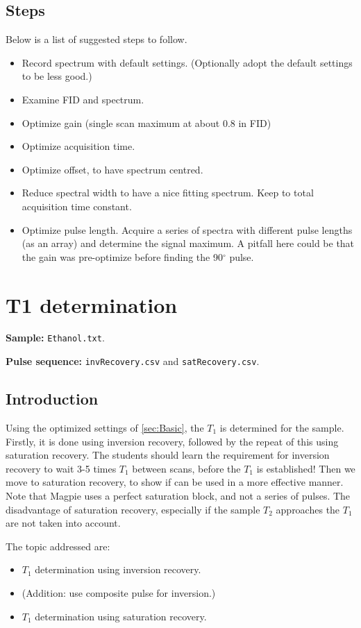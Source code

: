 \documentclass[11pt,a4paper]{article}
\begin{document}
\subsection{Steps}
Below is a list of suggested steps to follow.

\begin{itemize}
\item Record spectrum with default settings. (Optionally adopt the default settings to be less good.)
\item Examine FID and spectrum.
\item Optimize gain (single scan maximum at about 0.8 in FID)
\item Optimize acquisition time.
\item Optimize offset, to have spectrum centred.
\item Reduce spectral width to have a nice fitting spectrum. Keep to total acquisition time constant.
\item Optimize pulse length. Acquire a series of spectra with different pulse lengths (as an array) and determine the signal maximum. A pitfall here could be that the gain was pre-optimize before finding the 90$^\circ$ pulse.
\end{itemize}


\newpage

\section{T1 determination}
\textbf{Sample:} \texttt{Ethanol.txt}.

\textbf{Pulse sequence:} \texttt{invRecovery.csv} and \texttt{satRecovery.csv}.

\subsection{Introduction}
Using the optimized settings of \autoref{sec:Basic}, the $T_1$ is determined for the sample. Firstly, it is done using inversion recovery, followed by the repeat of this using saturation recovery. The students should learn the requirement for inversion recovery to wait 3-5 times $T_1$ between scans, before the $T_1$ is established! Then we move to saturation recovery, to show if can be used in a more effective manner. Note that Magpie uses a perfect saturation block, and not a series of pulses. The disadvantage of saturation recovery, especially if the sample $T_2$ approaches the $T_1$ are not taken into account.

The topic addressed are:
\begin{itemize}
\item $T_1$ determination using inversion recovery.
\item (Addition: use composite pulse for inversion.)
\item $T_1$ determination using saturation recovery.
\end{itemize}
\end{document}
